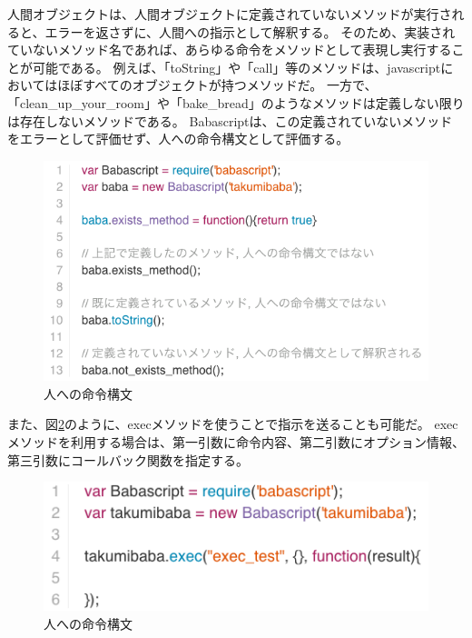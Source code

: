 人間オブジェクトは、人間オブジェクトに定義されていないメソッドが実行されると、エラーを返さずに、人間への指示として解釈する。
そのため、実装されていないメソッド名であれば、あらゆる命令をメソッドとして表現し実行することが可能である。
例えば、「toString」や「call」等のメソッドは、javascriptにおいてはほぼすべてのオブジェクトが持つメソッドだ。
一方で、「clean\_up\_your\_room」や「bake\_bread」のようなメソッドは定義しない限りは存在しないメソッドである。
Babascriptは、この定義されていないメソッドをエラーとして評価せず、人への命令構文として評価する。

\begin{figure}[htbp]
  \begin{center}
  \includegraphics[width=.8\linewidth,bb=0 0 577 330]{images/methodmissing_sample.js.png}
  \end{center}
  \caption{人への命令構文}
  \label{fig:methodmissing_sample}
\end{figure}

また、図\ref{fig:babascript_exec_method}のように、execメソッドを使うことで指示を送ることも可能だ。
execメソッドを利用する場合は、第一引数に命令内容、第二引数にオプション情報、第三引数にコールバック関数を指定する。

\begin{figure}[htbp]
  \begin{center}
  \includegraphics[width=.8\linewidth,bb=0 0 577 330]{images/babascript_exec_method.js.png}
  \end{center}
  \caption{人への命令構文}
  \label{fig:babascript_exec_method}
\end{figure}


